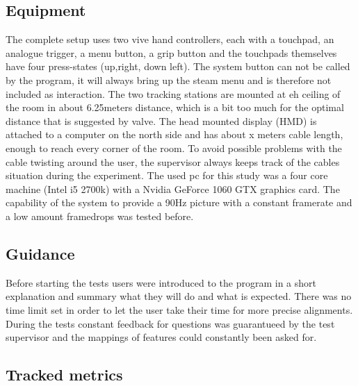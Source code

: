 \documentclass[hyperref,english,bachelorofscience,bibnum,twoside]{cgvpub}
\begin{document}
\subsection{Equipment}

The complete setup uses two vive hand controllers, each with a touchpad, an analogue trigger, a menu button, a grip button and the touchpads themselves have four press-states (up,right, down left). The system button can not be called by the program, it will always bring up the steam menu and is therefore not included as interaction. The two tracking stations are mounted at eh ceiling of the room in about 6.25meters distance, which is a bit too much for the optimal distance that is suggested by valve. The head mounted display (HMD) is attached to a computer on the north side and has about x meters cable length, enough to reach every corner of the room. To avoid possible problems with the cable twisting around the user, the supervisor always keeps track of the cables situation during the experiment.
The used pc for this study was a four core machine (Intel i5 2700k) with a Nvidia GeForce 1060 GTX graphics card. The capability of the system to provide a 90Hz picture with a constant framerate and a low amount framedrops was tested before.

\subsection{Guidance}

Before starting the tests users were introduced to the program in a short explanation and summary what they will do and what is expected. There was no time limit set in order to let the user take their time for more precise alignments. During the tests constant feedback for questions was guarantueed by the test supervisor and the mappings of features could constantly been asked for.

\subsection{Tracked metrics}
\end{document}
